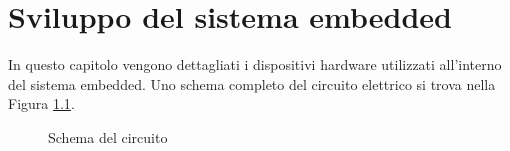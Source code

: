 \documentclass[12pt]{report}
\begin{document}
\chapter{Sviluppo del sistema embedded}
\label{cap2}
%

In questo capitolo vengono dettagliati i dispositivi hardware utilizzati all'interno del sistema embedded. Uno schema completo del circuito elettrico si trova nella Figura \ref{fig:schematics}.

\begin{figure}
	\caption{Schema del circuito}
	\label{fig:schematics}
\end{figure}
\end{document}
